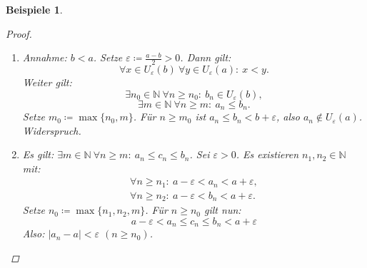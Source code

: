 \documentclass[12pt]{extreport} %
\newcommand{\N}{\mathbb{N}}
\theoremstyle{named}
\theoremstyle{itshape}
\theoremstyle{normal}
\newtheorem*{beispiele}{Beispiele}
\begin{document}
\begin{beispiele}
\begin{proof}
\begin{enumerate}
\begin{enumerate}
\begin{align*}
							  & \leq |a_{n}||b_{n} - b| + |b||a_{n}-a|.
					\end{align*}
					Mit \ref{2.1.b:satz} folgt: $\exists c \geq 0 ~ \forall n \in \N: ~ |a_{n}| \leq c$. Damit erhalten wir:
					$$
					\forall n \in \N: ~ c_{n} \leq c|b_{n}-b| + |b||a_{n}-a| \eqqcolon \alpha_{n}.
					$$	
					Mit c) (ii), c) (iii) und a) folgt: $\alpha_{n} \rightarrow 0$. \\
					Also: $|c_{n} - 0| = c_{n} \leq \alpha_{n}$ $(n \in \N)$ und $\alpha_{n} \rightarrow 0$. Mit b) folgt nun $c_{n} \rightarrow 0$.
				\item   Setze $\varepsilon \coloneqq \frac{|a|}{2}$. Aus (i) folgt: $|a_{n}| \rightarrow |a|$. Damit gilt: 
					$$  
					\exists m \in N ~ \forall n \geq m: ~ |a_{n}| \in U_{\varepsilon}(|a|) = (|a| - \varepsilon, |a| + \varepsilon). 
					= (\frac{|a|}{2}, \frac{3}{2} |a|) 
					$$
					Insbesondere ist $|a_{n}| > \frac{|a|}{2} > 0$ $(n \geq m)$, also $a_{n} \neq 0$ $(n \geq m)$. Für $n \geq m$ gilt nun:
					$$ \left| \frac{1}{a_{n}} - \frac{1}{a} \right| = \frac{|a_{n} - a|}{|a_{n}||a|} \leq \frac{2|a_{n} - a|}{|a|^{2}} \eqqcolon \alpha_{n} $$
					Es gilt $\alpha_{n} \rightarrow 0$. Mit b) folgt $\frac{1}{a_{n}} \rightarrow \frac{1}{a}$.
			  \end{enumerate}
			\item Annahme: $b < a$. Setze $\varepsilon \coloneqq \frac{a-b}{2} > 0$.  
					Dann gilt: $$\forall x \in U_{\varepsilon}(b) ~\forall y \in U_{\varepsilon}(a): ~x < y.$$ Weiter gilt: 
					$$ \exists n_{0} \in \N~ \forall n \geq n_{0}: ~ b_{n} \in U_{\varepsilon}(b), $$
					$$ \exists m \in \N ~\forall n \geq m: ~ a_{n} \leq b_{n}. $$
				Setze $m_{0} \coloneqq \max \{ n_{0}, m \}$. Für $n \geq m_{0}$ ist $a_{n} \leq b_{n} < b + \varepsilon$, also $a_{n} \notin U_{\varepsilon}(a)$.
				Widerspruch.
			\item   Es gilt: $\exists m \in \N ~\forall n \geq m: ~ a_{n} \leq c_{n} \leq b_{n}$. Sei $\varepsilon > 0$. Es existieren $n_{1}, n_{2} \in \N$ mit: 
				\begin{align*}
					\forall n \geq n_{1}: ~ a - \varepsilon < a_{n} < a + \varepsilon,  \\
					\forall n \geq n_{2}: ~ a - \varepsilon < b_{n} < a + \varepsilon.
				\end{align*}
				Setze $n_{0} \coloneqq \max \{ n_{1}, n_{2}, m \}$. Für $n \geq n_{0}$ gilt nun:
				$$
					a - \varepsilon < a_{n} \leq c_{n} \leq b_{n} < a + \varepsilon
				$$
				Also: $|a_{n} - a| < \varepsilon$ $(n \geq n_{0})$.
		\end{enumerate}	
	\end{proof}	
\end{beispiele}
\end{document}

